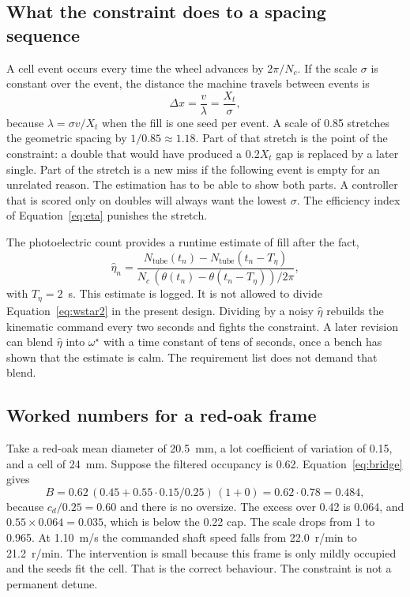 \subsection{What the constraint does to a spacing sequence}

A cell event occurs every time the wheel advances by $2\pi/N_c$. If the scale $\sigma$ is constant over the event, the distance the machine travels between events is
\begin{equation}
\Delta x = \frac{v}{\lambda} = \frac{X_t}{\sigma},
\label{eq:deltax}
\end{equation}
because $\lambda=\sigma v/X_t$ when the fill is one seed per event. A scale of 0.85 stretches the geometric spacing by $1/0.85\approx 1.18$. Part of that stretch is the point of the constraint: a double that would have produced a 0.2$X_t$ gap is replaced by a later single. Part of the stretch is a new miss if the following event is empty for an unrelated reason. The estimation has to be able to show both parts. A controller that is scored only on doubles will always want the lowest $\sigma$. The efficiency index of Equation~\eqref{eq:eta} punishes the stretch.

The photoelectric count provides a runtime estimate of fill after the fact,
\begin{equation}
\hat\eta_{n} = \frac{N_{\mathrm{tube}}(t_n)-N_{\mathrm{tube}}(t_n-T_{\eta})}{N_c\,(\theta(t_n)-\theta(t_n-T_{\eta}))/2\pi},
\label{eq:etahat}
\end{equation}
with $T_{\eta}=2$~s. This estimate is logged. It is not allowed to divide Equation~\eqref{eq:wstar2} in the present design. Dividing by a noisy $\hat\eta$ rebuilds the kinematic command every two seconds and fights the constraint. A later revision can blend $\hat\eta$ into $\omega^{\star}$ with a time constant of tens of seconds, once a bench has shown that the estimate is calm. The requirement list does not demand that blend.

\subsection{Worked numbers for a red-oak frame}

Take a red-oak mean diameter of 20.5~mm, a lot coefficient of variation of 0.15, and a cell of 24~mm. Suppose the filtered occupancy is 0.62. Equation~\eqref{eq:bridge} gives
\begin{equation}
B = 0.62\,(0.45+0.55\cdot 0.15/0.25)\,(1+0) = 0.62\cdot 0.78 = 0.484,
\end{equation}
because $c_d/0.25=0.60$ and there is no oversize. The excess over 0.42 is 0.064, and $0.55\times 0.064=0.035$, which is below the 0.22 cap. The scale drops from 1 to 0.965. At 1.10~m/s the commanded shaft speed falls from 22.0~r/min to 21.2~r/min. The intervention is small because this frame is only mildly occupied and the seeds fit the cell. That is the correct behaviour. The constraint is not a permanent detune.

